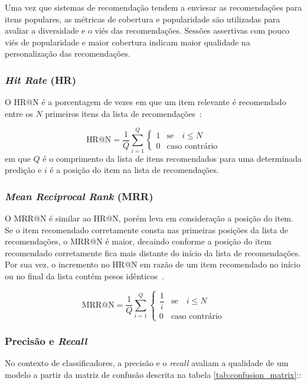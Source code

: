   Uma vez que sistemas de recomendação tendem a enviesar as recomendações para
  itens populares, as métricas de cobertura e popularidade são utilizadas para
  avaliar a diversidade e o viés das recomendações. Sessões assertivas com pouco
  viés de popularidade e maior cobertura indicam maior qualidade na
  personalização das recomendações.

  \subsubsection{\textit{Hit Rate} (HR)}
  O HR@N é a porcentagem de vezes em que um item relevante
  é recomendado entre os $N$ primeiros itens da lista de recomendações~\cite{sessionbaseddp}:

  \begin{equation}
    \text{HR@N} = \frac{1}{Q}\sum_{i=1}^{Q}\begin{cases}
      1 & \text{se} \quad i \leq N \\
      0 & \text{caso contrário}
    \end{cases}
  \end{equation}
  em que $Q$ é o comprimento da lista de itens recomendados para uma determinada
  predição e $i$ é a posição do item na lista de recomendações.
  \subsubsection{\textit{Mean Reciprocal Rank} (MRR)} O MRR@N é similar ao HR@N,
  porém leva em consideração a posição do item. Se o item recomendado
  corretamente consta nas primeiras posições da lista de recomendações, o MRR@N
  é maior, decaindo conforme a posição do item recomendado corretamente fica
  mais distante do início da lista de recomendações. Por sua vez, o incremento
  no HR@N em razão de um item recomendado no início ou no final da lista contém
  pesos idênticos~\cite{sessionbaseddp}.

  \begin{equation}
    \text{MRR@N} = \frac{1}{Q}\sum_{i=1}^{Q}\begin{cases}
      \dfrac{1}{i} & \text{se} \quad i \leq N \\
      0 & \text{caso contrário}
    \end{cases}
  \end{equation}

  \subsubsection{Precisão e \textit{Recall}}
  No contexto de classificadores, a precisão e o \textit{recall} avaliam
  a qualidade de um modelo a partir da matriz de confusão descrita
  na tabela \ref{tab:confusion_matrix}::


